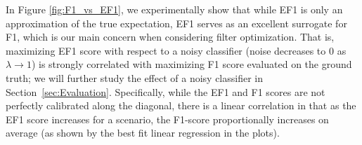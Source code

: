 









In Figure \ref{fig:F1_vs_EF1}, we experimentally show that while EF1 is only an approximation of the true expectation, EF1 serves as an excellent surrogate for F1, which is our main concern when considering filter optimization.  That is, maximizing EF1 score with respect to a noisy classifier (noise decreases to 0 as $\lambda \to 1$) is strongly correlated with maximizing F1 score evaluated on the ground truth; we will further study the effect of a noisy classifier in Section~\ref{sec:Evaluation}.   Specifically, while the EF1 and F1 scores are not perfectly calibrated along the diagonal, there is a linear correlation in that as the EF1 score increases for a scenario, the F1-score proportionally increases on average (as shown by the best fit linear regression in the plots).



